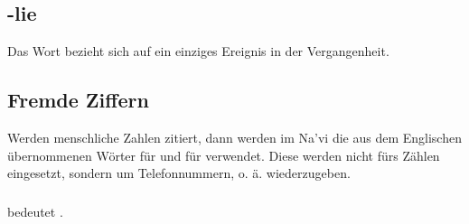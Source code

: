 \subsection{-lie} Das Wort  bezieht sich auf ein einziges Ereignis
in der Vergangenheit.

\subsection{Fremde Ziffern} Werden menschliche Zahlen zitiert, dann werden im Na’vi
die aus dem Englischen \"ubernommenen W\"orter  f\"ur  und
 f\"ur  verwendet. Diese werden nicht f\"urs Z\"ahlen eingesetzt,
sondern um Telefonnummern, o. \"a. wiederzugeben.

\subsubsection{}  bedeutet . 

